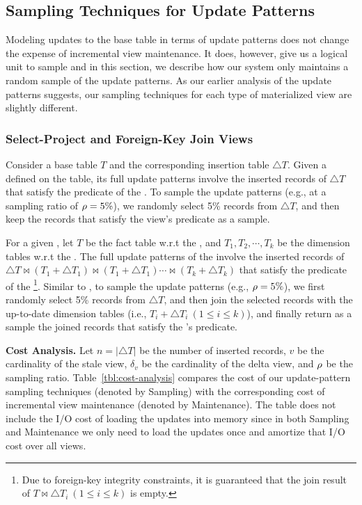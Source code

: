 \subsection{Sampling Techniques for Update Patterns}\label{subsec:sample-pattern}
Modeling updates to the base table in terms of update patterns does not change the expense of incremental view maintenance.
It does, however, give us a logical unit to sample and in this section, we describe how 
our system only maintains a random sample of the update patterns.
As our earlier analysis of the update patterns suggests, our sampling techniques for each type of materialized view are slightly different.

\subsubsection{Select-Project and Foreign-Key Join Views}
Consider a base table $T$ and the corresponding insertion table $\triangle T$. Given a \spview defined on the table, its full update patterns involve the inserted records of $\triangle T$ that satisfy the predicate of the \spview. To sample the update patterns (e.g., at a sampling ratio of $\rho  = 5 \%$), we randomly select 5\% records from $\triangle T$, and then keep the records that satisfy the view's predicate as a sample. 

\sloppy

For a given \fjview, let $T$ be the fact table w.r.t the \fjview, and $T_1, T_2, \cdots, T_k$ be the dimension tables w.r.t the \fjview. The full update patterns of the \fjview involve the inserted records of $\triangle T \bowtie (T_1+\triangle T_1) \bowtie (T_1+\triangle T_1) \cdots \bowtie (T_k+\triangle T_k)$ that satisfy the predicate of the \fjview\footnote{Due to foreign-key integrity constraints, it is guaranteed that the join result of $T \bowtie \triangle T_i ~(1\leq i \leq k)$ is empty.}. Similar to \spview, to sample the update patterns (e.g., $\rho = 5 \%$), we first randomly select 5\% records from $\triangle T$, and then join the selected records with the up-to-date dimension tables (i.e., $T_i + \triangle T_i ~(1\leq i \leq k)$), and finally return as a sample the joined records that satisfy the \fjview's predicate. 

\fussy



\vspace{.5em}


{\noindent \bf Cost Analysis.} Let $n = |\triangle T|$ be the number of inserted records, $v$ be the cardinality of the stale view, $\delta_v$ be the cardinality of the delta view, and $\rho $ be the sampling ratio. Table~\ref{tbl:cost-analysis} compares the cost of our update-pattern sampling techniques (denoted by Sampling) with the corresponding cost of incremental view maintenance (denoted by Maintenance). The table does not include the I/O cost of loading the updates into memory since in both Sampling and Maintenance we only need to load the updates once and amortize that I/O cost over all views.

